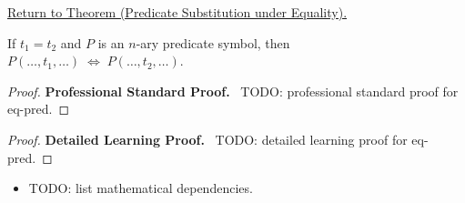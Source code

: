 \newpage
{}
\label{prf:eq-pred}

\begin{remark*}[Return]
\hyperref[thm:eq-pred]{Return to Theorem (Predicate Substitution under Equality).}
\end{remark*}

\begin{theorem*}
If $t_1 = t_2$ and $P$ is an $n$-ary predicate symbol, then
$P(\dots,t_1,\dots) \;\Leftrightarrow\; P(\dots,t_2,\dots)$.
\end{theorem*}

\begin{proof}
\textbf{Professional Standard Proof.}~
TODO: professional standard proof for eq-pred.
\end{proof}

\begin{proof}
\textbf{Detailed Learning Proof.}~
TODO: detailed learning proof for eq-pred.
\end{proof}

\begin{remark*}
\end{remark*}

\begin{dependencies}
\begin{itemize}
  \item TODO: list mathematical dependencies.
\end{itemize}
\end{dependencies}

\clearpage
